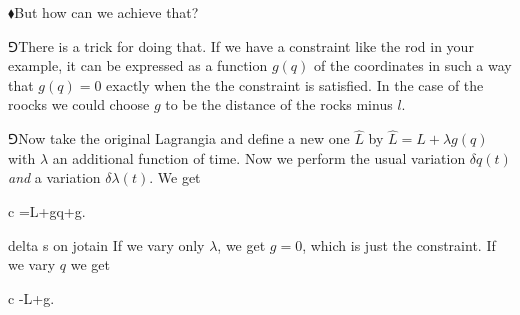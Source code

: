 \documentclass[11pt,oneside%
]{memoir}
\newenvironment{eqna}{\begin{IEEEeqnarray*}{c}}{\end{IEEEeqnarray*}\ignorespacesafterend}
\newcommand{\dd}{\mathrm{d}}
\newcommand{\primed}[1]{\hat{#1}}
\newcommand{\hea}{\(\blacklozenge\)\;}
\newcommand{\heb}{\(\Game\)\;}
\begin{document}
\hea But how can we achieve that?

\heb There is a trick for doing that. If we have a constraint like the rod in your example, it can be expressed as a function \(g(q)\) of the coordinates in such a way that \(g(q)=0\) exactly when the the constraint is satisfied. In the case of the roocks we could choose \(g\) to be the distance of the rocks minus \(l\).

\heb Now take the original Lagrangia and define a new one \(\primed{L}\) by \(\primed{L}=L+\lambda g(q)\) with \(\lambda\) an additional function of time. Now we perform the usual variation \(\delta q(t)\) \emph{and} a variation \(\delta \lambda(t)\). We get
\begin{eqna}
    \delta\primed{L}=\delta L+\lambda\partial g\delta q+g\delta\lambda.
\end{eqna}
delta s on jotain
If we vary only \(\lambda\), we get \(g=0\), which is just the constraint. If we vary \(q\) we get
\begin{eqna}
    -\partial L+\lambda \partial g.
\end{eqna}








\end{document}
